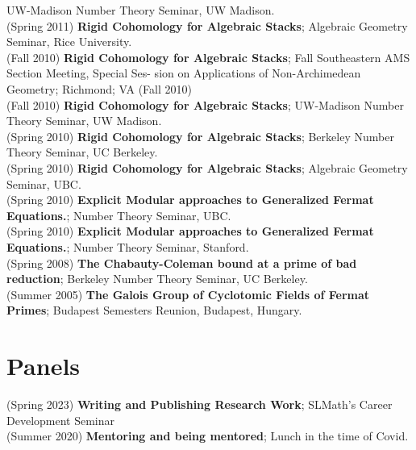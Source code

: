 \documentclass[margin,line]{res}
\begin{document}
\begin{resume}
 UW-Madison Number Theory Seminar, UW Madison.
\vspace{.05cm}\\
(Spring 2011) \textbf{Rigid Cohomology for Algebraic Stacks};
Algebraic Geometry Seminar, Rice University.
\vspace{.05cm}\\
(Fall 2010) \textbf{Rigid Cohomology for Algebraic Stacks};
Fall Southeastern AMS Section Meeting, Special Ses-
sion on Applications of Non-Archimedean Geometry; Richmond; VA (Fall 2010)
\vspace{.05cm}\\
(Fall 2010) \textbf{Rigid Cohomology for Algebraic Stacks};
 UW-Madison Number Theory Seminar, UW Madison.
\vspace{.05cm}\\
(Spring 2010) \textbf{Rigid Cohomology for Algebraic Stacks};
 Berkeley Number Theory Seminar, UC Berkeley.
\vspace{.05cm}\\
(Spring 2010) \textbf{Rigid Cohomology for Algebraic Stacks};
Algebraic Geometry Seminar, UBC.
\vspace{.05cm}\\
(Spring 2010) \textbf{Explicit Modular approaches to Generalized Fermat Equations.};
 Number Theory Seminar, UBC.
\vspace{.05cm}\\
(Spring 2010) \textbf{Explicit Modular approaches to Generalized Fermat Equations.};
 Number Theory Seminar, Stanford.
\vspace{.05cm}\\
(Spring 2008) \textbf{The Chabauty-Coleman bound at a prime of bad reduction};
 Berkeley Number Theory Seminar, UC Berkeley.
\vspace{.05cm}\\
(Summer 2005) \textbf{The Galois Group of Cyclotomic Fields of Fermat Primes};
Budapest Semesters Reunion, Budapest, Hungary. 
\vspace{.05cm}\\
  
  
\section{\sc Panels}
(Spring 2023) \textbf{ Writing and Publishing Research Work};
SLMath's Career Development Seminar
\vspace{.05cm}\\  
(Summer 2020) \textbf{Mentoring and being mentored};
Lunch in the time of Covid. 
\vspace{.05cm}\\


\end{resume}
\end{document}
